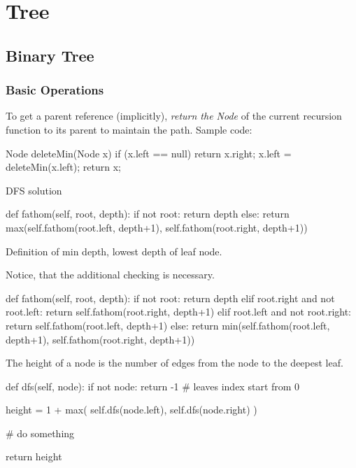 \chapter{Tree}

\section{Binary Tree}
\subsection{Basic Operations}
 To get a parent reference (implicitly), \textit{return the Node} of the current recursion function to its parent to maintain the path. Sample code:
\begin{java}
Node deleteMin(Node x) {
    if (x.left == null) return x.right;
    x.left = deleteMin(x.left);
    return x;
}
\end{java}

 DFS solution
\begin{python}
def fathom(self, root, depth):
    if not root: return depth
    else: return max(self.fathom(root.left, depth+1), 
                     self.fathom(root.right, depth+1))
\end{python}

 Definition of min depth, lowest depth of leaf node. 

Notice, that the additional checking is necessary.
\begin{python}
def fathom(self, root, depth):
    if not root: 
        return depth
    elif root.right and not root.left: 
        return self.fathom(root.right, depth+1)
    elif root.left and not root.right: 
        return self.fathom(root.left, depth+1)
    else: 
        return min(self.fathom(root.left, depth+1), 
                   self.fathom(root.right, depth+1))
\end{python}

 The height of a node is the number of edges from the node to the deepest leaf.

\begin{python}
def dfs(self, node):
    if not node:
        return -1  # leaves index start from 0

    height = 1 + max(
        self.dfs(node.left), 
        self.dfs(node.right)
    )
    
    # do something
     
    return height
\end{python}

